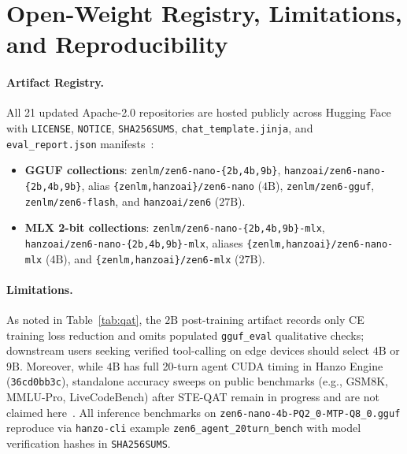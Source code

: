 \documentclass[11pt,a4paper]{article}
\begin{document}
\section{Open-Weight Registry, Limitations, and Reproducibility}

\paragraph{Artifact Registry.}
All 21 updated Apache-2.0 repositories are hosted publicly across Hugging Face with \texttt{LICENSE}, \texttt{NOTICE}, \texttt{SHA256SUMS}, \texttt{chat\_template.jinja}, and \texttt{eval\_report.json} manifests~\cite{hanzo2026weights}:
\begin{itemize}[noitemsep]
  \item \textbf{GGUF collections}: \texttt{zenlm/zen6-nano-\{2b,4b,9b\}}, \texttt{hanzoai/zen6-nano-\{2b,4b,9b\}}, alias \texttt{\{zenlm,hanzoai\}/zen6-nano} ($4\text{B}$), \texttt{zenlm/zen6-gguf}, \texttt{zenlm/zen6-flash}, and \texttt{hanzoai/zen6} ($27\text{B}$).
  \item \textbf{MLX 2-bit collections}: \texttt{zenlm/zen6-nano-\{2b,4b,9b\}-mlx}, \\ \texttt{hanzoai/zen6-nano-\{2b,4b,9b\}-mlx}, aliases \texttt{\{zenlm,hanzoai\}/zen6-nano-mlx} ($4\text{B}$), and \texttt{\{zenlm,hanzoai\}/zen6-mlx} ($27\text{B}$).
\end{itemize}

\paragraph{Limitations.}
As noted in Table~\ref{tab:qat}, the $2\text{B}$ post-training artifact records only CE training loss reduction and omits populated \texttt{gguf\_eval} qualitative checks; downstream users seeking verified tool-calling on edge devices should select $4\text{B}$ or $9\text{B}$. Moreover, while $4\text{B}$ has full 20-turn agent CUDA timing in Hanzo Engine (\texttt{36cd0bb3c}), standalone accuracy sweeps on public benchmarks (e.g., GSM8K, MMLU-Pro, LiveCodeBench) after STE-QAT remain in progress and are not claimed here~\cite{prismml2026bonsai2}. All inference benchmarks on \texttt{zen6-nano-4b-PQ2\_0-MTP-Q8\_0.gguf} reproduce via \texttt{hanzo-cli} example \texttt{zen6\_agent\_20turn\_bench} with model verification hashes in \texttt{SHA256SUMS}.



\end{document}

